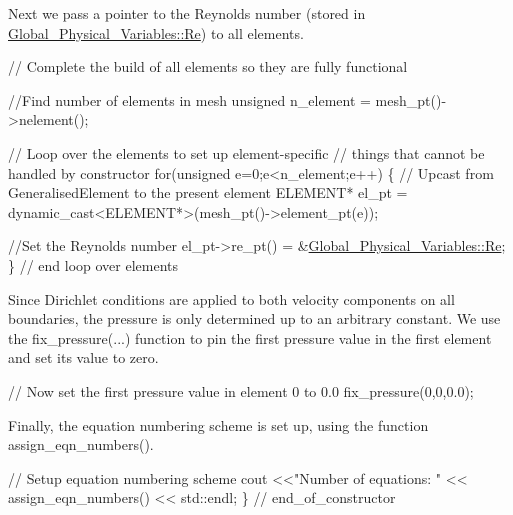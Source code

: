 Next we pass a pointer to the Reynolds number (stored in {\ttfamily \hyperlink{namespaceGlobal__Physical__Variables_ab814e627d2eb5bc50318879d19ab16b9}{Global\+\_\+\+Physical\+\_\+\+Variables\+::\+Re}}) to all elements.


\begin{DoxyCodeInclude}
 \textcolor{comment}{// Complete the build of all elements so they are fully functional}

 \textcolor{comment}{//Find number of elements in mesh}
 \textcolor{keywordtype}{unsigned} n\_element = mesh\_pt()->nelement();

 \textcolor{comment}{// Loop over the elements to set up element-specific }
 \textcolor{comment}{// things that cannot be handled by constructor}
 \textcolor{keywordflow}{for}(\textcolor{keywordtype}{unsigned} e=0;e<n\_element;e++)
  \{
   \textcolor{comment}{// Upcast from GeneralisedElement to the present element}
   ELEMENT* el\_pt = \textcolor{keyword}{dynamic\_cast<}ELEMENT*\textcolor{keyword}{>}(mesh\_pt()->element\_pt(e));

   \textcolor{comment}{//Set the Reynolds number}
   el\_pt->re\_pt() = &\hyperlink{namespaceGlobal__Physical__Variables_ab814e627d2eb5bc50318879d19ab16b9}{Global\_Physical\_Variables::Re};
  \} \textcolor{comment}{// end loop over elements}

\end{DoxyCodeInclude}


Since Dirichlet conditions are applied to both velocity components on all boundaries, the pressure is only determined up to an arbitrary constant. We use the {\ttfamily fix\+\_\+pressure}(...) function to pin the first pressure value in the first element and set its value to zero.


\begin{DoxyCodeInclude}
 \textcolor{comment}{// Now set the first pressure value in element 0 to 0.0}
 fix\_pressure(0,0,0.0);

\end{DoxyCodeInclude}


Finally, the equation numbering scheme is set up, using the function {\ttfamily assign\+\_\+eqn\+\_\+numbers()}.


\begin{DoxyCodeInclude}
 \textcolor{comment}{// Setup equation numbering scheme}
 cout <<\textcolor{stringliteral}{"Number of equations: "} << assign\_eqn\_numbers() << std::endl; 
\} \textcolor{comment}{// end\_of\_constructor}

\end{DoxyCodeInclude}




